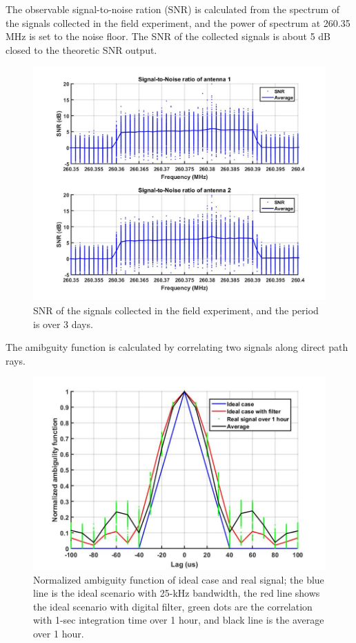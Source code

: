 \documentclass[draftcls,onecolumn]{IEEEtran}  %
\begin{document}
The observable signal-to-noise ration (SNR) is calculated from the spectrum of the signals collected in the field experiment, and the power of spectrum at 260.35 MHz is set to the noise floor. The SNR of the collected signals is about 5 dB closed to the theoretic SNR output.
\begin{figure}[h]
	\centering
	\includegraphics[width=\textwidth]{pdf/SNR.jpg}
	\caption{SNR of the signals collected in the field experiment, and the period is over 3 days.}
	\centering
	\label{fig:link_budget}
\end{figure}

The amibguity function is calculated by correlating two signals along direct path rays.
\begin{figure}[h]
	\centering
	\includegraphics[width=\textwidth]{pdf/ACF.jpg}
	\caption{Normalized ambiguity function of ideal case and real signal; the blue line is the ideal scenario with 25-kHz bandwidth, the red line shows the ideal scenario with digital filter, green dots are the correlation with 1-sec integration time over 1 hour, and black line is the average over 1 hour.}
	\centering
	\label{fig:ACF}
\end{figure}
\end{document}

